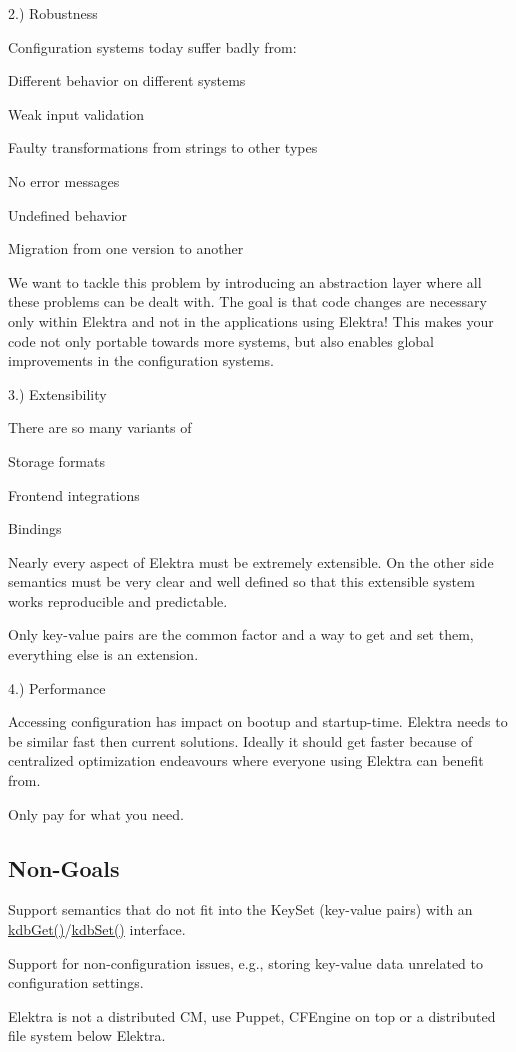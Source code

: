 2.) Robustness

Configuration systems today suffer badly from\+:


\begin{DoxyItemize}
\item Different behavior on different systems
\item Weak input validation
\item Faulty transformations from strings to other types
\item No error messages
\item Undefined behavior
\item Migration from one version to another
\end{DoxyItemize}

We want to tackle this problem by introducing an abstraction layer where all these problems can be dealt with. The goal is that code changes are necessary only within Elektra and not in the applications using Elektra! This makes your code not only portable towards more systems, but also enables global improvements in the configuration systems.

3.) Extensibility

There are so many variants of


\begin{DoxyItemize}
\item Storage formats
\item Frontend integrations
\item Bindings
\end{DoxyItemize}

Nearly every aspect of Elektra must be extremely extensible. On the other side semantics must be very clear and well defined so that this extensible system works reproducible and predictable.

Only key-\/value pairs are the common factor and a way to get and set them, everything else is an extension.

4.) Performance

Accessing configuration has impact on bootup and startup-\/time. Elektra needs to be similar fast then current solutions. Ideally it should get faster because of centralized optimization endeavours where everyone using Elektra can benefit from.

Only pay for what you need.

\subsection*{Non-\/\+Goals}


\begin{DoxyItemize}
\item Support semantics that do not fit into the Key\+Set (key-\/value pairs) with an {\ttfamily \hyperlink{group__kdb_ga28e385fd9cb7ccfe0b2f1ed2f62453a1}{kdb\+Get()}}/{\ttfamily \hyperlink{group__kdb_ga11436b058408f83d303ca5e996832bcf}{kdb\+Set()}} interface.
\item Support for non-\/configuration issues, e.\+g., storing key-\/value data unrelated to configuration settings.
\item Elektra is not a distributed CM, use Puppet, C\+F\+Engine on top or a distributed file system below Elektra. 
\end{DoxyItemize}